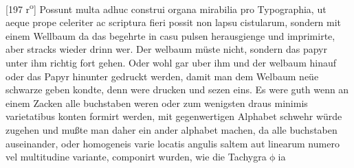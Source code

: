                 \vspace*{8mm}
                \pstart 
                \normalsize
            [197 r\textsuperscript{o}] Possunt multa adhuc construi organa mirabilia pro Typographia\protect{}, ut aeque prope celeriter ac scriptura fieri possit non lapsu cistularum, sondern mit einem Wellbaum\protect{} da das begehrte in casu pulsen herausgienge und imprimirte, aber stracks wieder drinn wer. Der welbaum\protect{} m\"{u}ste nicht, sondern das papyr\protect{} unter ihm richtig fort gehen. Oder wohl gar uber ihm und der welbaum\protect{} hinauf oder das Papyr\protect{} hinunter gedruckt werden, damit man dem Welbaum\protect{} ne\"{u}e schwarze geben kondte, denn were drucken und sezen eins. Es were guth wenn an einem Zacken alle buchstaben weren oder zum wenigsten draus minimis varietatibus konten formirt werden,  mit gegenwertigen Alphabet schwehr w\"{u}rde zugehen und mußte man daher ein ander alphabet machen, da alle buchstaben auseinander, oder homogeneis varie locatis angulis saltem aut linearum numero vel multitudine variante, componirt wurden, wie die Tachygra$\upphi$ia
